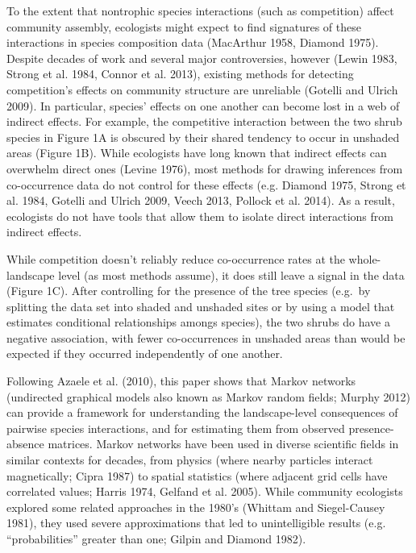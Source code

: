 \documentclass[12pt,]{article}
\begin{document}
\begin{spacing}{1.9}
\begin{flushleft}
\noindent
To the extent that nontrophic species interactions (such as competition)
affect community assembly, ecologists might expect to find signatures of
these interactions in species composition data (MacArthur 1958, Diamond
1975). Despite decades of work and several major controversies, however
(Lewin 1983, Strong et al. 1984, Connor et al. 2013), existing methods
for detecting competition's effects on community structure are
unreliable (Gotelli and Ulrich 2009). In particular, species' effects on
one another can become lost in a web of indirect effects. For example,
the competitive interaction between the two shrub species in Figure 1A
is obscured by their shared tendency to occur in unshaded areas (Figure
1B). While ecologists have long known that indirect effects can
overwhelm direct ones (Levine 1976), most methods for drawing inferences
from co-occurrence data do not control for these effects (e.g. Diamond
1975, Strong et al. 1984, Gotelli and Ulrich 2009, Veech 2013, Pollock
et al. 2014). As a result, ecologists do not have tools that allow them
to isolate direct interactions from indirect effects.

While competition doesn't reliably reduce co-occurrence rates at the
whole-landscape level (as most methods assume), it does still leave a
signal in the data (Figure 1C). After controlling for the presence of
the tree species (e.g.~by splitting the data set into shaded and
unshaded sites or by using a model that estimates conditional
relationships amongs species), the two shrubs do have a negative
association, with fewer co-occurrences in unshaded areas than would be
expected if they occurred independently of one another.

Following Azaele et al. (2010), this paper shows that Markov networks
(undirected graphical models also known as Markov random fields; Murphy
2012) can provide a framework for understanding the landscape-level
consequences of pairwise species interactions, and for estimating them
from observed presence-absence matrices. Markov networks have been used
in diverse scientific fields in similar contexts for decades, from
physics (where nearby particles interact magnetically; Cipra 1987) to
spatial statistics (where adjacent grid cells have correlated values;
Harris 1974, Gelfand et al. 2005). While community ecologists explored
some related approaches in the 1980's (Whittam and Siegel-Causey 1981),
they used severe approximations that led to unintelligible results (e.g.
``probabilities'' greater than one; Gilpin and Diamond 1982).


\end{flushleft}
\end{spacing}
\end{document}
